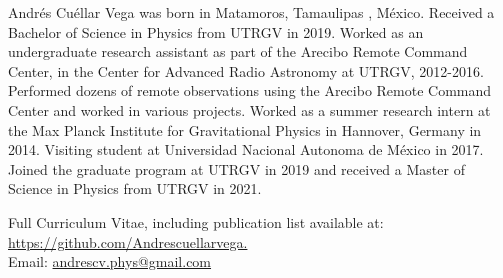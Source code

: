 \noindent
Andr\'{e}s Cu\'{e}llar Vega was born in Matamoros, Tamaulipas , M\'{e}xico.
Received a Bachelor of Science in Physics from UTRGV in 2019.
Worked as an undergraduate research assistant as part of the Arecibo Remote Command Center, in the Center for Advanced Radio Astronomy at UTRGV, 2012-2016. Performed dozens of remote observations using the Arecibo Remote Command Center and worked in various projects.
Worked as a summer research intern at the Max Planck Institute for Gravitational Physics in Hannover, Germany in 2014. Visiting student at Universidad Nacional Autonoma de M\'{e}xico in 2017. Joined the graduate program at UTRGV in 2019 and received a Master of Science in Physics from UTRGV in 2021.

\noindent
Full Curriculum Vitae, including publication list available at: \href{https://github.com/Andrescuellarvega}{https://github.com/Andrescuellarvega.}\\
Email: \href{mailto:andrescv.phys@gmail.com}{andrescv.phys@gmail.com}
